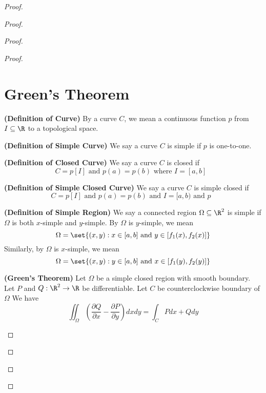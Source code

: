 \documentclass{report}
\begin{document}
\begin{proof}
\begin{proof}
\begin{proof}
\begin{proof}
\section{Green's Theorem}
\begin{definition}
\label{9.3.1}
\textbf{(Definition of Curve)} By a curve $C$, we mean a continuous function  $p$ from $I\subseteq \R$  to a topological space.
\end{definition}
\begin{definition}
\label{9.3.2}
\textbf{(Definition of Simple Curve)} We say a curve $C$ is simple if $p$ is one-to-one.
\end{definition}
\begin{definition}
\label{9.3.3}
\textbf{(Definition of Closed Curve)} We say a curve $C$ is closed if 
 \begin{equation}
C=p[I]\text{ and }p(a)=p(b)\text{ where $I=[a,b]$ }
\end{equation}
\end{definition}
\begin{definition}
\label{9.3.4}
\textbf{(Definition of Simple Closed Curve)} We say a curve $C$ is simple closed if 
 \begin{equation}
C=p[I]\text{ and }p(a)=p(b)\text{ and }I=[a,b)\text{ and }p\text{  }
\end{equation}
\end{definition}
\begin{definition}
\label{9.3.5}
\textbf{(Definition of Simple Region)} We say a connected region $\Omega\subseteq \R^2$ is simple if $\Omega$ is both $x$-simple and  $y$-simple. By $\Omega$ is $y$-simple, we mean 
 \begin{equation}
\Omega=\set{(x,y):x\in [a,b]\text{ and }y\in [f_1(x),f_2(x)]}
\end{equation}
Similarly, by $\Omega$ is $x$-simple, we mean
 \begin{equation}
\Omega=\set{(x,y):y\in [a,b]\text{ and }x\in [f_1(y),f_2(y)]}
\end{equation}
\end{definition}
\begin{theorem}
\label{9.3.6}
\textbf{(Green's Theorem)} Let $\Omega$ be a simple closed region with smooth boundary. Let $P$ and  $Q:\R^2\rightarrow \R$ be differentiable. Let $C$ be counterclockwise boundary of  $\Omega$ We have
\begin{equation}
\iint_{\Omega} \left(\frac{\partial Q}{\partial  x}-\frac{\partial P}{\partial y} \right) dxdy=\int_C Pdx+Qdy
\end{equation}

\end{theorem}
\end{proof}
\end{proof}
\end{proof}
\end{proof}
\end{document}
